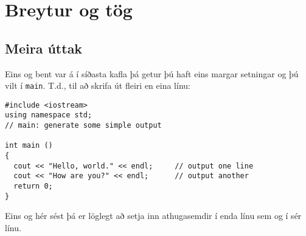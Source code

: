 






\chapter{Breytur og tög}

\section{Meira úttak}

Eins og bent var á í síðasta kafla þá getur þú haft eins margar setningar og þú vilt í {\tt main}.
T.d., til að skrifa út fleiri en eina línu: 

\begin{verbatim}
#include <iostream>
using namespace std;
// main: generate some simple output

int main ()
{
  cout << "Hello, world." << endl;     // output one line
  cout << "How are you?" << endl;      // output another
  return 0;
}
\end{verbatim}
%
Eins og hér sést þá er löglegt að setja inn athugasemdir í enda línu sem og í sér línu.

